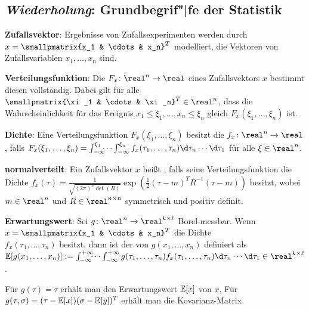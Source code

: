 \pagebreak

\subsection{%
    \emph{Wiederholung}: Grundbegrif"|fe der Statistik%
}

\textbf{Zufallsvektor}:
Ergebnisse von Zufallsexperimenten werden durch 
$x = \smallpmatrix{x_1 & \cdots & x_n}^T$ modelliert, die Vektoren von Zufallsvariablen
$x_1, \dotsc, x_n$ sind.

\textbf{Verteilungsfunktion}:
Die  $F_x\colon \real^n \rightarrow \real$
eines Zufallsvektors $x$ bestimmt diesen vollständig.
Dabei gilt für alle $\smallpmatrix{\xi_1 & \cdots & \xi_n}^T \in \real^n$, dass die
Wahrscheinlichkeit für das Ereignis $x_1 \le \xi_1, \dotsc, x_n \le \xi_n$ gleich
$F_x(\xi_1, \dotsc, \xi_n)$ ist.

\textbf{Dichte}:
Eine Verteilungsfunktion $F_x(\xi_1, \dotsc, \xi_n)$ besitzt die 
$f_x\colon \real^n \rightarrow \real$, falls
$F_x(\xi_1, \dotsc, \xi_n) = \int_{-\infty}^{\xi_1} \!\!\!\dotsb \int_{-\infty}^{\xi_n}
f_x(\tau_1, \dotsc, \tau_n) \d\tau_n \dotsb \d\tau_1$ für alle $\xi \in \real^n$.

\textbf{normalverteilt}:
Ein Zufallsvektor $x$ heißt ,
falls seine Verteilungsfunktion die Dichte
$f_x(\tau) = \frac{1}{\sqrt{(2\pi)^n \det(R)}}
\exp\!\left(\frac{1}{2} (\tau - m)^T R^{-1} (\tau - m)\right)$
besitzt, wobei $m \in \real^n$ und $R \in \real^{n \times n}$ symmetrisch und positiv definit.

\linie

\textbf{Erwartungswert}:
Sei $g\colon \real^n \rightarrow \real^{k \times \ell}$ Borel-messbar.
Wenn $x = \smallpmatrix{x_1 & \cdots & x_n}^T$ die Dichte\\
$f_x(\tau_1, \dotsc, \tau_n)$ besitzt,
dann ist der  von $g(x_1, \dotsc, x_n)$ definiert als\\
$\EE[g(x_1, \dotsc, x_n)] := \int_{-\infty}^{+\infty} \!\!\!\dotsb \int_{-\infty}^{+\infty}
g(\tau_1, \dotsc, \tau_n) f_x(\tau_1, \dotsc, \tau_n) \d\tau_n \dotsb \d\tau_1 \in
\real^{k \times \ell}$.

Für $g(\tau) = \tau$ erhält man den Erwartungswert $\mathbb{E}[x]$ von $x$.
Für $g(\tau, \sigma) = (\tau - \mathbb{E}[x]) (\sigma - \mathbb{E}[y])^T$ erhält man die Kovarianz-Matrix.

